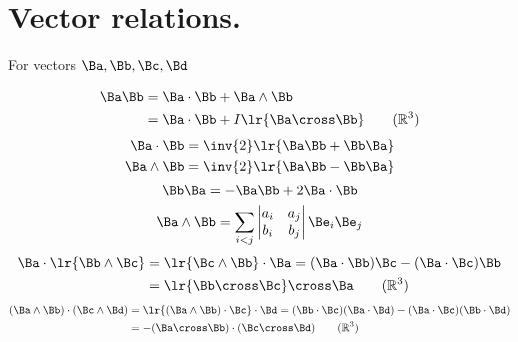 %
%
\section{Vector relations.}
For vectors \( \Ba, \Bb, \Bc, \Bd \)

\begin{equation}\label{eqn:helpful:20}
\begin{aligned}
\Ba \Bb &= \Ba \cdot \Bb + \Ba \wedge \Bb \\
        &= \Ba \cdot \Bb + I\lr{ \Ba \cross \Bb}\qquad (\mathbb{R}^3)
\end{aligned}
\end{equation}
\begin{equation}\label{eqn:helpful:40}
\begin{aligned}
\Ba \cdot \Bb &= \inv{2} \lr{ \Ba \Bb + \Bb \Ba } \\
\Ba \wedge \Bb &= \inv{2} \lr{ \Ba \Bb - \Bb \Ba }
\end{aligned}
\end{equation}
\begin{equation}\label{eqn:helpful:60}
\Bb \Ba = -\Ba \Bb + 2 \Ba \cdot \Bb
\end{equation}
\begin{equation}\label{eqn:helpful:80}
\Ba \wedge \Bb
=
\sum_{i < j}
\begin{vmatrix}
a_i & a_j \\
b_i & b_j
\end{vmatrix}
\Be_i \Be_j
\end{equation}
\begin{equation}\label{eqn:helpful:100}
\begin{aligned}
\Ba \cdot \lr{ \Bb \wedge \Bc }
&=
\lr{ \Bc \wedge \Bb } \cdot \Ba
=
( \Ba \cdot \Bb ) \Bc
-( \Ba \cdot \Bc ) \Bb \\
&= \lr{ \Bb \cross \Bc } \cross \Ba\qquad (\mathbb{R}^3)
\end{aligned}
\end{equation}
\begin{equation}\label{eqn:helpful:120}
\begin{aligned}
(\Ba \wedge \Bb) \cdot (\Bc \wedge \Bd)
&=
\lr{ (\Ba \wedge \Bb) \cdot \Bc} \cdot \Bd
=
(\Bb \cdot \Bc) (\Ba \cdot \Bd)
-(\Ba \cdot \Bc)( \Bb \cdot \Bd) \\
&= -(\Ba \cross \Bb) \cdot (\Bc \cross \Bd)\qquad (\mathbb{R}^3)
\end{aligned}
\end{equation}
